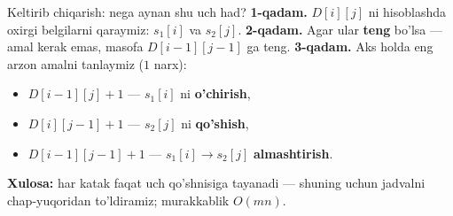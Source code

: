 \documentclass[aspectratio=169,11pt]{beamer}
\begin{document}
\begin{frame}{Keltirib chiqarish: nega aynan shu uch had?}
  \textbf{1-qadam.} $D[i][j]$ ni hisoblashda oxirgi belgilarni qaraymiz:
  $s_1[i]$ va $s_2[j]$.
  \pause
  \textbf{2-qadam.} Agar ular \textbf{teng} bo'lsa --- amal kerak emas,
  masofa $D[i{-}1][j{-}1]$ ga teng.
  \pause
  \textbf{3-qadam.} Aks holda eng arzon amalni tanlaymiz ($1$ narx):
  \begin{itemize}\small\setlength\itemsep{2pt}
    \item $D[i{-}1][j]+1$ --- $s_1[i]$ ni \textbf{o'chirish},
    \item $D[i][j{-}1]+1$ --- $s_2[j]$ ni \textbf{qo'shish},
    \item $D[i{-}1][j{-}1]+1$ --- $s_1[i] \to s_2[j]$ \textbf{almashtirish}.
  \end{itemize}
  \begin{tcolorbox}[okbox,top=2pt,bottom=2pt]
    \small \textbf{Xulosa:} har katak faqat uch qo'shnisiga tayanadi ---
    shuning uchun jadvalni chap-yuqoridan to'ldiramiz; murakkablik $O(mn)$.
  \end{tcolorbox}
\end{frame}
\end{document}
